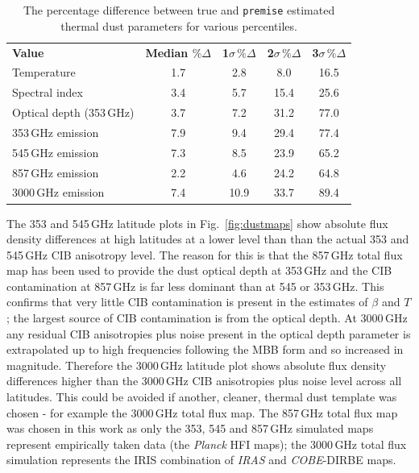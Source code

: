 \documentclass[a4paper,fleqn,usenatbib]{mnras}
\begin{document}
{\begin{table}
 \caption{The percentage difference between true and {\texttt{premise}} estimated thermal dust parameters for various percentiles.}
 \label{tab:accstats}
 \begin{tabular}{l| c| c| c| c}
\hline
{\bf{Value}} &{\bf{ Median $\% \Delta$}}  & {\bf{1$ \sigma \, \% \Delta$}}  & {\bf{2$ \sigma \, \% \Delta$}}  & {\bf{3$ \sigma \, \% \Delta$}}  \\ 
Temperature & 1.7 & 2.8 & 8.0 & 16.5 \\
Spectral index & 3.4 & 5.7 & 15.4 & 25.6 \\
Optical depth (353\,GHz) & 3.7 & 7.2 & 31.2 & 77.0\\
353\,GHz emission & 7.9 & 9.4 & 29.4 & 77.4 \\
545\,GHz emission & 7.3 & 8.5 & 23.9 & 65.2 \\
857\,GHz emission & 2.2 & 4.6 & 24.2 & 64.8 \\
3000\,GHz emission & 7.4 & 10.9 & 33.7 & 89.4 \\
  \hline
 \end{tabular}
\end{table}

The 353 and 545\,GHz latitude plots in Fig.~\ref{fig:dustmaps} show absolute flux density differences at high latitudes at a lower level than than the actual 353 and 545\,GHz CIB anisotropy level. The reason for this is that the 857\,GHz total flux map has been used to provide the dust optical depth at 353\,GHz and the CIB contamination at 857\,GHz is far less dominant than at 545 or 353\,GHz. This confirms that very little CIB contamination is present in the estimates of $\beta$ and $T$; the largest source of CIB contamination is from the optical depth. At 3000\,GHz any residual CIB anisotropies plus noise present in the optical depth parameter is extrapolated up to high frequencies following the MBB form and so increased in magnitude. Therefore the 3000\,GHz latitude plot shows absolute flux density differences higher than the 3000\,GHz CIB anisotropies plus noise level across all latitudes. This could be avoided if another, cleaner, thermal dust template was chosen - for example the 3000\,GHz total flux map. The 857\,GHz total flux map was chosen in this work as only the 353, 545 and 857\,GHz simulated maps represent empirically taken data (the {\it{Planck}} HFI maps); the 3000\,GHz total flux simulation represents the IRIS combination of {\it{IRAS}} and {\it{COBE}}-DIRBE maps. 


}
\end{document}
